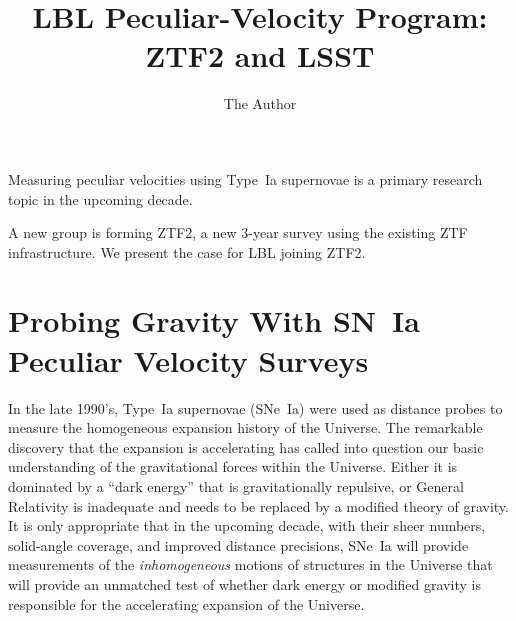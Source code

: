 \documentclass[11pt, oneside]{article}   	%
\title{LBL Peculiar-Velocity Program: ZTF2 and LSST}
\author{The Author}
\begin{document}
\maketitle


Measuring peculiar velocities using Type~Ia supernovae is a primary research topic in the upcoming decade.

A new group is forming ZTF2, a new 3-year survey using the existing ZTF infrastructure.  We present the case for LBL joining ZTF2.

\section{Probing Gravity With SN~Ia  Peculiar Velocity Surveys}
In the late 1990's, Type~Ia supernovae (SNe~Ia) were used as distance probes to measure the homogeneous expansion history of the Universe.  The remarkable discovery
that the expansion is accelerating  has called into question our basic understanding of the gravitational forces within the Universe.  Either it
is dominated by a ``dark energy'' that is gravitationally repulsive, or General Relativity is inadequate and needs to be replaced by a modified theory of
gravity.  It is only appropriate that in the upcoming decade, with their sheer numbers, solid-angle coverage,
and improved distance precisions, SNe~Ia will provide measurements of the {\it inhomogeneous} motions of structures in the Universe
that will provide an unmatched test of whether dark energy or modified gravity is responsible for the accelerating expansion of the Universe.
\end{document}
